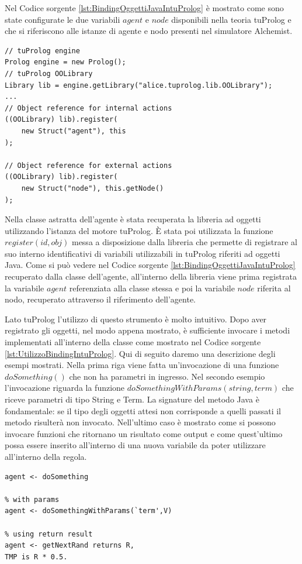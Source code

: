 Nel Codice sorgente \ref{lst:BindingOggettiJavaIntuProlog} è mostrato come sono state configurate le due variabili $agent$ e $node$ disponibili nella teoria tuProlog e che si riferiscono alle istanze di agente e nodo presenti nel simulatore Alchemist.
\begin{lstlisting}[float,firstnumber=1,label={lst:BindingOggettiJavaIntuProlog},caption={Binding oggetti Java in tuProlog}]
// tuProlog engine
Prolog engine = new Prolog();
// tuProlog OOLibrary
Library lib = engine.getLibrary("alice.tuprolog.lib.OOLibrary");
...
// Object reference for internal actions
((OOLibrary) lib).register(
	new Struct("agent"), this
);

// Object reference for external actions
((OOLibrary) lib).register(
	new Struct("node"), this.getNode()
);
\end{lstlisting}
Nella classe astratta dell'agente è stata recuperata la libreria ad oggetti utilizzando l'istanza del motore tuProlog.
\`E stata poi utilizzata la funzione $register(id, obj)$ messa a disposizione dalla libreria che permette di registrare al suo interno identificativi di variabili utilizzabili in tuProlog riferiti ad oggetti Java.
Come si può vedere nel Codice sorgente \ref{lst:BindingOggettiJavaIntuProlog} recuperato dalla classe dell'agente, all'interno della libreria viene prima registrata la variabile $agent$ referenziata alla classe stessa e poi la variabile $node$ riferita al nodo, recuperato attraverso il riferimento dell'agente.

Lato tuProlog l'utilizzo di questo strumento è molto intuitivo. Dopo aver registrato gli oggetti, nel modo appena mostrato, è sufficiente invocare i metodi implementati all'interno della classe come mostrato nel Codice sorgente \ref{lst:UtilizzoBindingIntuProlog}. Qui di seguito daremo una descrizione degli esempi mostrati.
Nella prima riga viene fatta un'invocazione di una funzione $doSomething()$ che non ha parametri in ingresso.
Nel secondo esempio l'invocazione riguarda la funzione $doSomethingWithParams(string, term)$ che riceve parametri di tipo String e Term. La signature del metodo Java è fondamentale: se il tipo degli oggetti attesi non corrisponde a quelli passati il metodo risulterà non invocato.
Nell'ultimo caso è mostrato come si possono invocare funzioni che ritornano un risultato come output e come quest'ultimo possa essere inserito all'interno di una nuova variabile da poter utilizzare all'interno della regola.

\medskip
\begin{lstlisting}[float,firstnumber=1,label={lst:UtilizzoBindingIntuProlog},caption={Utilizzo riferimenti oggetti Java in tuProlog}]
% no params
agent <- doSomething

% with params
agent <- doSomethingWithParams(`term',V)

% using return result
agent <- getNextRand returns R,
TMP is R * 0.5.
\end{lstlisting}

